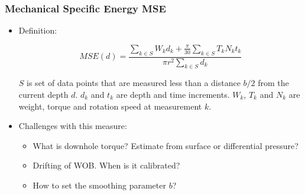 \documentclass{beamer}
\begin{document}
\begin{frame} \frametitle{Mechanical Specific Energy MSE} 
\vspace{-1cm}

\begin{itemize}
\item<1-> Definition:

\begin{equation*}
MSE(d) = \frac{\sum_{k \in S}  W_k d_k  +\frac{ \pi}{30}\sum_{k \in S}  T_k N_k t_k }{\pi r^2 \sum_{k \in S} d_k } 
\end{equation*}

$S$ is set of data points that are measured less than a distance $b/2$ from the current depth $d$.  $d_k$ and $t_k$ are depth and time increments.  $W_k$, $T_k$ and $N_k$ are weight, torque and rotation speed at measurement $k$.

\item<3-> Challenges with this measure:
\begin{itemize}
\item<3-> What is downhole torque? Estimate from surface or differential pressure?
\item<3-> Drifting of WOB. When is it calibrated?
\item<3-> How to set the smoothing parameter $b$?
\end{itemize}

\end{itemize}

\end{frame}
\end{document}
